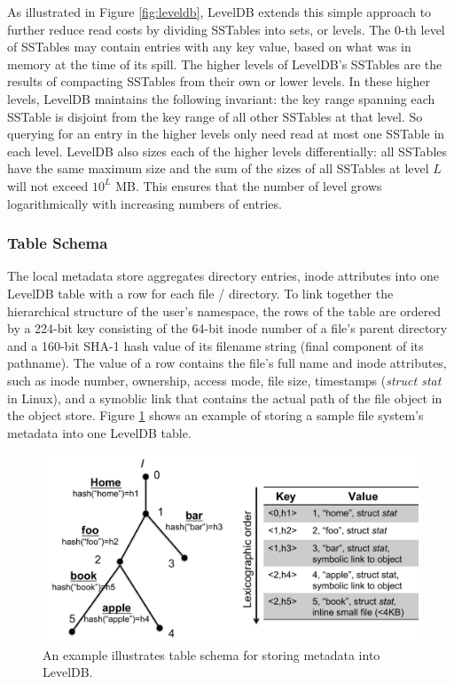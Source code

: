 As illustrated in Figure \ref{fig:leveldb}, LevelDB extends this simple approach to further reduce read costs by dividing SSTables into sets, or levels.
The 0-th level of SSTables may contain entries with any key value, based on what was in memory at the time of its spill.
The higher levels of LevelDB's SSTables are the results of compacting SSTables from their own or lower levels.
In these higher levels, LevelDB maintains the following invariant: the key range spanning each SSTable is disjoint from the key range of all other SSTables at that level.
So querying for an entry in the higher levels only need read at most one SSTable in each level.
LevelDB also sizes each of the higher levels differentially:  all SSTables have the same maximum size and the sum of the sizes of all SSTables at level $L$ will not exceed $10^L$ MB.
This ensures that the number of level grows logarithmically with increasing numbers of entries.

\subsubsection*{Table Schema} 

The local metadata store aggregates directory entries, 
inode attributes into one LevelDB table with a row for each file / directory.
To link together the hierarchical structure of the user's namespace,
the rows of the table are ordered by a 224-bit key consisting of 
the 64-bit inode number of a file's parent directory 
and a 160-bit SHA-1 hash value of its filename string (final component of its pathname).
The value of a row contains the file's full name and inode attributes,
such as inode number, ownership, access mode, file size, timestamps (\textit{struct stat} in Linux),
and a symoblic link that contains the actual path of the file object in the object store.
Figure \ref{fig:schema} shows an example of storing a sample file system's metadata into one LevelDB table.

\begin{figure}[!ht]
\centering
\includegraphics[scale=0.35]{figs/schema}
\caption{An example illustrates table schema for storing metadata into LevelDB.}
\label{fig:schema}
\end{figure}


